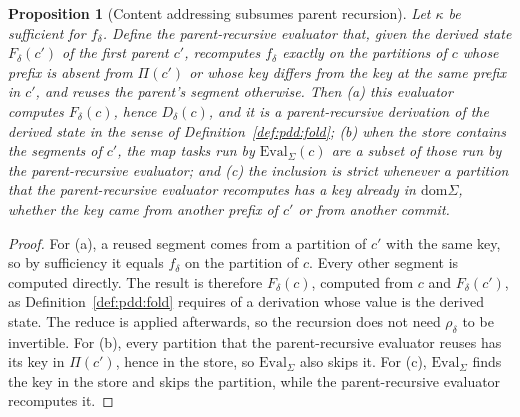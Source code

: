 \documentclass[11pt,letterpaper]{article}
\newtheorem{proposition}[theorem]{Proposition}
\theoremstyle{definition}
\theoremstyle{remark}
\newcommand{\Eval}{\mathrm{Eval}}
\newcommand{\dom}{\mathrm{dom}}
\begin{document}
\begin{proposition}[Content addressing subsumes parent recursion]
\label{prop:pdd:fixpoint}
Let $\kappa$ be sufficient for $f_\delta$. Define the parent-recursive evaluator that, given the derived state $F_\delta(c')$ of the first parent $c'$, recomputes $f_\delta$ exactly on the partitions of $c$ whose prefix is absent from $\Pi(c')$ or whose key differs from the key at the same prefix in $c'$, and reuses the parent's segment otherwise. Then (a) this evaluator computes $F_\delta(c)$, hence $D_\delta(c)$, and it is a parent-recursive derivation of the derived state in the sense of Definition~\ref{def:pdd:fold}; (b) when the store contains the segments of $c'$, the map tasks run by $\Eval_\Sigma(c)$ are a subset of those run by the parent-recursive evaluator; and (c) the inclusion is strict whenever a partition that the parent-recursive evaluator recomputes has a key already in $\dom\Sigma$, whether the key came from another prefix of $c'$ or from another commit.
\end{proposition}

\begin{proof}
For (a), a reused segment comes from a partition of $c'$ with the same key, so by sufficiency it equals $f_\delta$ on the partition of $c$. Every other segment is computed directly. The result is therefore $F_\delta(c)$, computed from $c$ and $F_\delta(c')$, as Definition~\ref{def:pdd:fold} requires of a derivation whose value is the derived state. The reduce is applied afterwards, so the recursion does not need $\rho_\delta$ to be invertible. For (b), every partition that the parent-recursive evaluator reuses has its key in $\Pi(c')$, hence in the store, so $\Eval_\Sigma$ also skips it. For (c), $\Eval_\Sigma$ finds the key in the store and skips the partition, while the parent-recursive evaluator recomputes it.
\end{proof}
\end{document}
